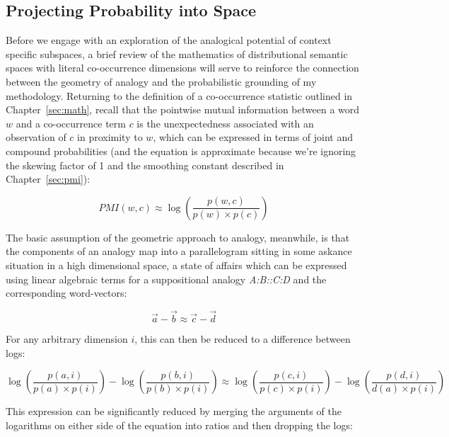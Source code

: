 \subsection{Projecting Probability into Space} \label{sec:anamath}
Before we engage with an exploration of the analogical potential of context specific subspaces, a brief review of the mathematics of distributional semantic spaces with literal co-occurrence dimensions will serve to reinforce the connection between the geometry of analogy and the probabilistic grounding of my methodology.  Returning to the definition of a co-occurrence statistic outlined in Chapter~\ref{sec:math}, recall that the pointwise mutual information between a word $w$ and a co-occurrence term $c$ is the unexpectedness associated with an observation of $c$ in proximity to $w$, which can be expressed in terms of joint and compound probabilities (and the equation is approximate because we're ignoring the skewing factor of 1 and the smoothing constant described in Chapter~\ref{sec:pmi}):

\begin{equation}
PMI(w,c) \approx \log\left(\frac{p(w,c)}{p(w) \times p(c)}\right)
\end{equation}

\noindent The basic assumption of the geometric approach to analogy, meanwhile, is that the components of an analogy map into a parallelogram sitting in some askance situation in a high dimensional space, a state of affairs which can be expressed using linear algebraic terms for a suppositional analogy \emph{A:B::C:D} and the corresponding word-vectors:

\begin{equation}
\overrightarrow{a} - \overrightarrow{b} \approx \overrightarrow{c} - \overrightarrow{d}
\end{equation}

\noindent For any arbitrary dimension $i$, this can then be reduced to a difference between logs:

\begin{equation}
\log\left(\frac{p(a,i)}{p(a) \times p(i)}\right) - \log\left(\frac{p(b,i)}{p(b) \times p(i)}\right) \approx \log\left(\frac{p(c,i)}{p(c) \times p(i)}\right) - \log\left(\frac{p(d,i)}{d(a) \times p(i)}\right)
\end{equation}

\noindent This expression can be significantly reduced by merging the arguments of the logarithms on either side of the equation into ratios and then dropping the logs:

